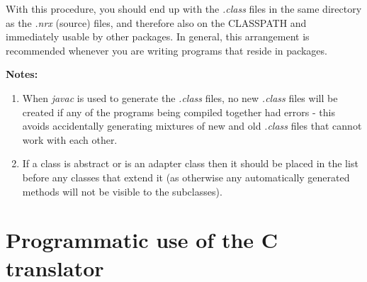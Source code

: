 With this procedure, you should end up with the \emph{.class} files in
the same directory as the \emph{.nrx} (source) files, and therefore also
on the CLASSPATH and immediately usable by other packages.  In general,
this arrangement is recommended whenever you are writing programs that
reside in packages.

\textbf{Notes:}
\begin{enumerate}
\item
When \emph{javac} is used to generate the \emph{.class} files, no
new \emph{.class} files will be created if any of the programs being
compiled together had errors - this avoids accidentally generating
mixtures of new and old \emph{.class} files that cannot work with each
other.
\item
If a class is abstract or is an adapter class then it should be placed
in the list before any classes that extend it (as otherwise any
automatically generated methods will not be visible to the subclasses).
\end{enumerate}

\chapter{Programmatic use of the \nr{}C translator}





